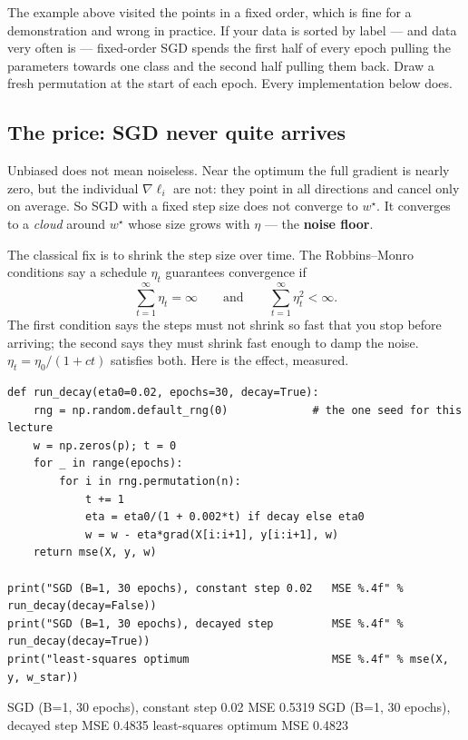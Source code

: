 \documentclass[11pt]{article}
\begin{document}
\begin{caution}
The example above visited the points in a fixed order, which is fine for a
demonstration and wrong in practice. If your data is sorted by label --- and
data very often is --- fixed-order SGD spends the first half of every epoch
pulling the parameters towards one class and the second half pulling them back.
Draw a fresh permutation at the start of each epoch. Every implementation below
does.
\end{caution}

\subsection{The price: SGD never quite arrives}

Unbiased does not mean noiseless. Near the optimum the full gradient is nearly
zero, but the individual $\nabla \ell_i$ are not: they point in all directions
and cancel only on average. So SGD with a fixed step size does not converge to
$w^\star$. It converges to a \emph{cloud} around $w^\star$ whose size grows
with $\eta$ --- the \textbf{noise floor}.

The classical fix is to shrink the step size over time. The Robbins--Monro
conditions say a schedule $\eta_t$ guarantees convergence if
\[
  \sum_{t=1}^{\infty} \eta_t = \infty
  \qquad\text{and}\qquad
  \sum_{t=1}^{\infty} \eta_t^2 < \infty .
\]
The first condition says the steps must not shrink so fast that you stop before
arriving; the second says they must shrink fast enough to damp the noise.
$\eta_t = \eta_0/(1 + ct)$ satisfies both. Here is the effect, measured.

\begin{lstlisting}
def run_decay(eta0=0.02, epochs=30, decay=True):
    rng = np.random.default_rng(0)             # the one seed for this lecture
    w = np.zeros(p); t = 0
    for _ in range(epochs):
        for i in rng.permutation(n):
            t += 1
            eta = eta0/(1 + 0.002*t) if decay else eta0
            w = w - eta*grad(X[i:i+1], y[i:i+1], w)
    return mse(X, y, w)

print("SGD (B=1, 30 epochs), constant step 0.02   MSE %.4f" % run_decay(decay=False))
print("SGD (B=1, 30 epochs), decayed step         MSE %.4f" % run_decay(decay=True))
print("least-squares optimum                      MSE %.4f" % mse(X, y, w_star))
\end{lstlisting}
\begin{codeout}
SGD (B=1, 30 epochs), constant step 0.02   MSE 0.5319
SGD (B=1, 30 epochs), decayed step         MSE 0.4835
least-squares optimum                      MSE 0.4823
\end{codeout}
\end{document}
